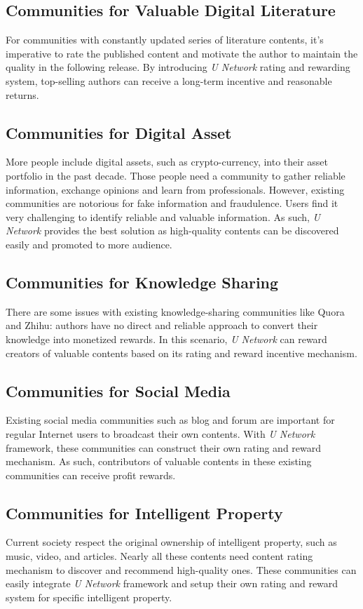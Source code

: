  \subsection{Communities for Valuable Digital Literature}
For communities with constantly updated series of literature contents, it's imperative to rate the published content and motivate the author to maintain the quality in the following release. By introducing \emph{U Network} rating and rewarding system, top-selling authors can receive a long-term incentive and reasonable returns.  


 \subsection{ Communities for Digital Asset}
More people include digital assets, such as crypto-currency\cite{bitcoin,eth,eth2}, into their asset portfolio in the past decade. Those people need a community to gather reliable information, exchange opinions and learn from professionals. However, existing communities are notorious for fake information and fraudulence. Users find it very challenging to identify reliable and valuable information. As such, \emph{U Network} provides the best solution as high-quality contents can be discovered easily and promoted to more audience.  

 \subsection{Communities for Knowledge Sharing}
There are some issues with existing knowledge-sharing communities like Quora and Zhihu: authors have no direct and reliable approach to convert their knowledge into monetized rewards. In this scenario, \emph{U Network} can reward creators of valuable contents based on its rating and reward incentive mechanism. 

 \subsection{Communities for Social Media}
Existing social media communities such as blog and forum are important for regular Internet users to broadcast their own contents. With \emph{U Network} framework, these communities can construct their own rating and reward mechanism. As such, contributors of valuable contents in these existing communities can receive profit rewards. 

 \subsection{Communities for Intelligent Property}
Current society respect the original ownership of intelligent property, such as music, video, and articles. Nearly all these contents need content rating mechanism to discover and recommend high-quality ones. These communities can easily integrate \emph{U Network} framework and setup their own rating and reward system for specific intelligent property. 



